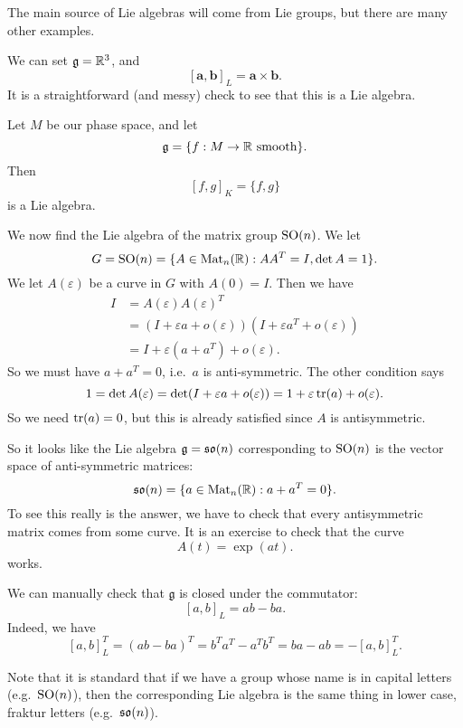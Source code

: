 \documentclass[a4paper]{article}
\begin{document}
The main source of Lie algebras will come from Lie groups, but there are many other examples.

\begin{eg}
  We can set $\mathfrak{g} = \mathbb{R}^3$, and
  \[
    [\mathbf{a}, \mathbf{b}]_L = \mathbf{a} \times \mathbf{b}.
  \]
  It is a straightforward (and messy) check to see that this is a Lie algebra.
\end{eg}

\begin{eg}
  Let $M$ be our phase space, and let
  \[
    \mathfrak{g} = \{f: M \to \mathbb{R} \text{ smooth}\}.
  \]
  Then
  \[
    [f, g]_K = \{f, g\}
  \]
  is a Lie algebra.
\end{eg}

\begin{eg}
  We now find the Lie algebra of the matrix group $\mathrm{SO}(n)$. We let
  \[
    G = \mathrm{SO}(n) = \{A \in \mathrm{Mat}_n(\mathbb{R}): AA^T = I, \det A = 1\}.
  \]
  We let $A(\varepsilon)$ be a curve in $G$ with $A(0) = I$. Then we have
  \begin{align*}
    I &= A(\varepsilon) A(\varepsilon)^T \\
    &= (I + \varepsilon a + o(\varepsilon))(I + \varepsilon a^T + o(\varepsilon))\\
    &= I + \varepsilon(a + a^T) + o(\varepsilon).
  \end{align*}
  So we must have $a + a^T = 0$, i.e.\ $a$ is anti-symmetric. The other condition says
  \[
    1 = \det A(\varepsilon) = \det (I + \varepsilon a + o(\varepsilon)) = 1 + \varepsilon \operatorname{tr}(a) + o(\varepsilon).
  \]
  So we need $\operatorname{tr} (a) = 0$, but this is already satisfied since $A$ is antisymmetric.

  So it looks like the Lie algebra $\mathfrak{g} = \mathfrak{so}(n)$ corresponding to $\mathrm{SO}(n)$ is the vector space of anti-symmetric matrices:
  \[
    \mathfrak{so}(n) = \{a \in \mathrm{Mat}_n(\mathbb{R}): a + a^T = 0\}.
  \]
  To see this really is the answer, we have to check that every antisymmetric matrix comes from some curve. It is an exercise to check that the curve
  \[
    A(t) = \exp(at).
  \]
  works.

  We can manually check that $\mathfrak{g}$ is closed under the commutator:
  \[
    [a, b]_L = ab - ba.
  \]
  Indeed, we have
  \[
    [a, b]_L^T = (ab - ba)^T = b^T a^T - a^T b^T = ba - ab = - [a, b]_L^T.
  \]
\end{eg}
Note that it is standard that if we have a group whose name is in capital letters (e.g.\ $\mathrm{SO}(n)$), then the corresponding Lie algebra is the same thing in lower case, fraktur letters (e.g.\ $\mathfrak{so}(n)$).
\end{document}

